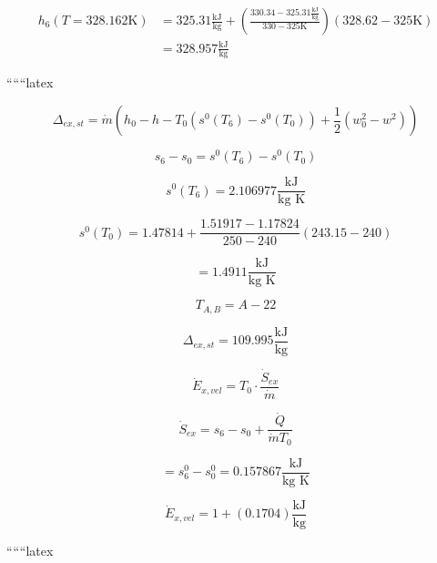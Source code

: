 \begin{align*}
    h_6 (T = 328.162 \text{K}) &= 325.31 \frac{\text{kJ}}{\text{kg}} + \left( \frac{330.34 - 325.31 \frac{\text{kJ}}{\text{kg}}}{330 - 325 \text{K}} \right) (328.62 - 325 \text{K}) \\
    &= 328.957 \frac{\text{kJ}}{\text{kg}}
\end{align*}

``````latex


\[
\Delta_{ex,st} = \dot{m} \left( h_0 - h - T_0 \left( s^0(T_6) - s^0(T_0) \right) + \frac{1}{2} \left( w_0^2 - w^2 \right) \right)
\]

\[
s_6 - s_0 = s^0(T_6) - s^0(T_0)
\]

\[
s^0(T_6) = 2.106977 \frac{\text{kJ}}{\text{kg K}}
\]

\[
s^0(T_0) = 1.47814 + \frac{1.51917 - 1.17824}{250 - 240} (243.15 - 240)
\]

\[
= 1.4911 \frac{\text{kJ}}{\text{kg K}}
\]

\[
T_{A,B} = A - 22
\]

\[
\Delta_{ex,st} = 109.995 \frac{\text{kJ}}{\text{kg}}
\]

\[
\dot{E}_{x,vel} = T_0 \cdot \frac{\dot{S}_{ex}}{\dot{m}}
\]

\[
\dot{S}_{ex} = s_6 - s_0 + \frac{\dot{Q}}{\dot{m} T_0}
\]

\[
= s^0_6 - s^0_0 = 0.157867 \frac{\text{kJ}}{\text{kg K}}
\]

\[
\dot{E}_{x,vel} = 1 + (0.1704) \frac{\text{kJ}}{\text{kg}}
\]

``````latex


